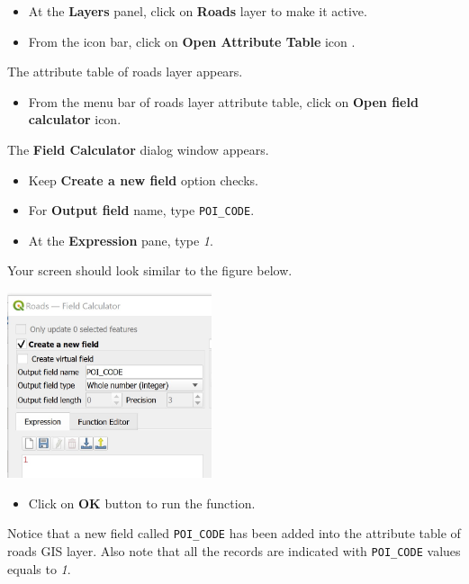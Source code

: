\documentclass[
  letterpaper,
  DIV=11,
  numbers=noendperiod]{scrreprt}
\providecommand{\tightlist}{%
  \setlength{\itemsep}{0pt}\setlength{\parskip}{0pt}}\usepackage{longtable,booktabs,array}
\begin{document}
\begin{itemize}
\tightlist
\item
  At the \textbf{Layers} panel, click on \textbf{Roads} layer to make it
  active.
\item
  From the icon bar, click on \textbf{Open Attribute Table} icon .
\end{itemize}

The attribute table of roads layer appears.

\begin{itemize}
\tightlist
\item
  From the menu bar of roads layer attribute table, click on
  \textbf{Open field calculator} icon.
\end{itemize}

The \textbf{Field Calculator} dialog window appears.

\begin{itemize}
\tightlist
\item
  Keep \textbf{Create a new field} option checks.
\item
  For \textbf{Output field} name, type \texttt{POI\_CODE}.
\item
  At the \textbf{Expression} pane, type \emph{1}.
\end{itemize}

Your screen should look similar to the figure below.

\includegraphics[width=0.45\textwidth,height=\textheight]{./img07/image23.jpg}

\begin{itemize}
\tightlist
\item
  Click on \textbf{OK} button to run the function.
\end{itemize}

Notice that a new field called \texttt{POI\_CODE} has been added into
the attribute table of roads GIS layer. Also note that all the records
are indicated with \texttt{POI\_CODE} values equals to \emph{1}.
\end{document}
